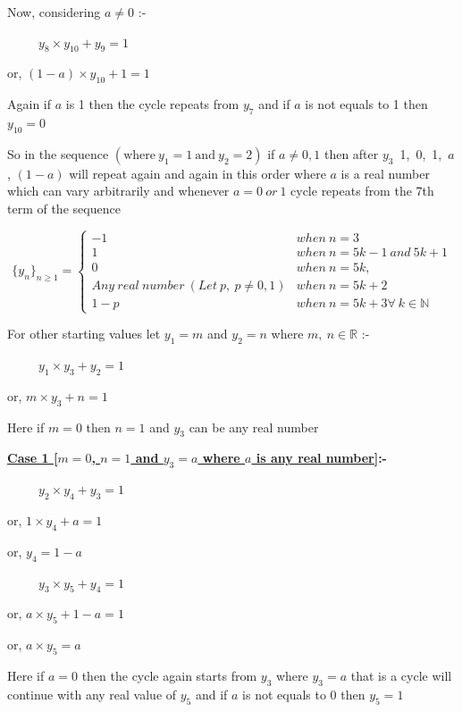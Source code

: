 \documentclass{article}
\begin{document}
\begin{enumerate}
 Now, considering $a \neq 0$ :-
 
 \ \ \ \ \ $y_8\times y_{10} + y_9=1$
 
 or, $(1-a)\times y_{10}+1=1$
 
 Again if $a$ is 1 then the cycle repeats from $y_7$ and if $a$ is not equals to 1 then $y_{10}=0$
 
 So in the sequence $(\text{where}\ y_1=1 \ \text{and}\ y_2=2)$ if $a\neq 0,1$ then after $y_3$\ 1,\ 0,\ 1,\ $a$, $(1-a)$ will repeat again and again in this order where $a$ is a real number which can vary arbitrarily and whenever $a=0 \ or \ 1$ cycle repeats from the 7th term of the sequence 
 
 \begin{equation}
   \{y_n \}_{n\geq 1}=  
     \begin{cases}
       -1 & when \ n=3\\
       1 & when \  n=5k-1\ and \ 5k+1\\
       0 & when \ n=5k,\\
       Any \ real \ number\ (Let \ p,\ p\neq 0,1)& when\ n=5k+2\\
       1-p & when\ n=5k+3 \forall \  k\in \mathbb{N}
     \end{cases} 
 \end{equation}
 \bigskip
 
 \bigskip
 
 
 
 For other starting values let $y_1=m$ and $y_2=n$ where $m,\ n\in \mathbb{R}$ :-
 
 \ \ \ \ \ $y_1\times y_3 + y_2=1$
 
 or, $m\times y_3+ n=1$
 
 Here if $m=0$ then $n=1$ and $y_3$ can be any real number
 \bigskip
 
\textbf{ \underline{\large{Case 1 [$m=0$, $n=1$ and $y_3=a$ where $a$ is any real number]}}:-}

\ \ \ \ \ $y_2\times y_4 + y_3=1$

or, $1\times y_4+ a=1$

or, $y_4=1-a$
\bigskip

\ \ \ \ \ $y_3\times y_5 + y_4=1$

or, $a\times y_5+ 1-a=1$

or, $a\times y_5=a$

Here if $a=0$ then the cycle again starts from $y_3$ where $y_3=a$ that is a cycle will continue with any real value of $y_5$ and if $a$ is not equals to 0 then $y_5=1$
\bigskip


\end{enumerate}
\end{document}
